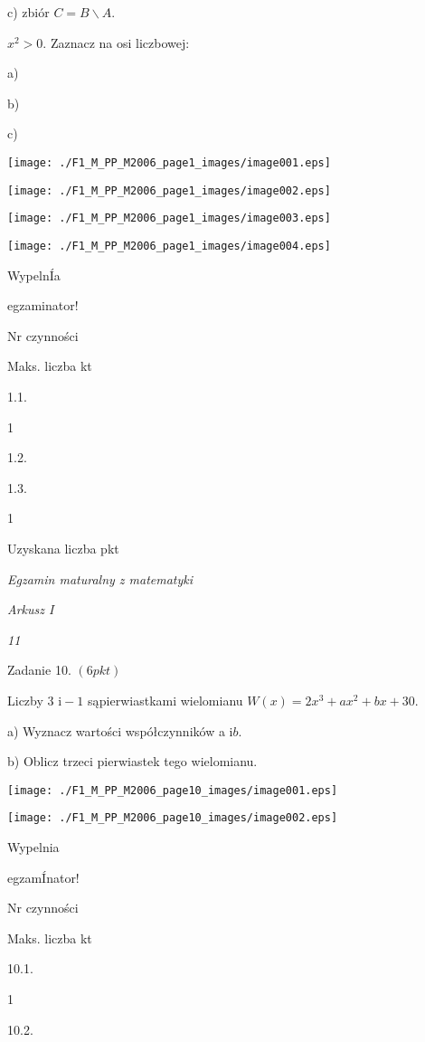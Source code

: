 \documentclass[a4paper,12pt]{article}
\begin{document}
c) zbiór $C=B\backslash A.$

$x^{2}>0$. Zaznacz na osi liczbowej:

a)

b)

c)
\begin{center}
\texttt{[image: ./F1\_M\_PP\_M2006\_page1\_images/image001.eps]}

\texttt{[image: ./F1\_M\_PP\_M2006\_page1\_images/image002.eps]}

\texttt{[image: ./F1\_M\_PP\_M2006\_page1\_images/image003.eps]}

\texttt{[image: ./F1\_M\_PP\_M2006\_page1\_images/image004.eps]}
\end{center}
WypelnÍa

egzaminator!

Nr czynności

Maks. liczba kt

1.1.

1

1.2.

1.3.

1

Uzyskana liczba pkt





{\it Egzamin maturalny z matematyki}

{\it Arkusz I}

{\it 11}

Zadanie 10. $(6pkt)$

Liczby 3 $\mathrm{i}-1$ sąpierwiastkami wielomianu $W(x)=2x^{3}+ax^{2}+bx+30.$

a) Wyznacz wartości współczynników a $\mathrm{i}b.$

b) Oblicz trzeci pierwiastek tego wielomianu.
\begin{center}
\texttt{[image: ./F1\_M\_PP\_M2006\_page10\_images/image001.eps]}

\texttt{[image: ./F1\_M\_PP\_M2006\_page10\_images/image002.eps]}
\end{center}
Wypelnia

egzamÍnator!

Nr czynności

Maks. liczba kt

10.1.

1

10.2.
\end{document}
